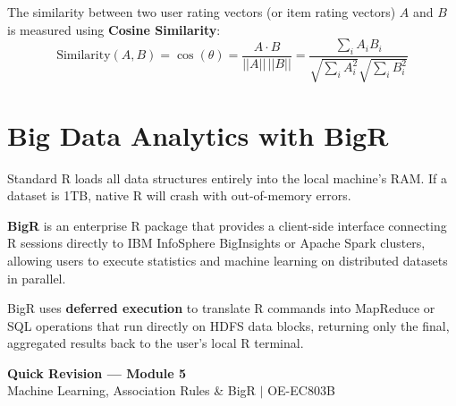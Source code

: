 \documentclass[12pt,a4paper]{article}
\begin{document}
\begin{tcolorbox}[formulabox, title={Cosine Similarity Metric}]
  The similarity between two user rating vectors (or item rating vectors) $A$ and $B$ is measured using \textbf{Cosine Similarity}:
  $$\text{Similarity}(A, B) = \cos(\theta) = \frac{A \cdot B}{||A|| \, ||B||} = \frac{\sum_{i} A_i B_i}{\sqrt{\sum_{i} A_i^2} \sqrt{\sum_{i} B_i^2}}$$
\end{tcolorbox}

\section{Big Data Analytics with BigR}

Standard R loads all data structures entirely into the local machine's RAM. If a dataset is 1TB, native R will crash with out-of-memory errors.

\begin{tcolorbox}[defbox, title={BigR}]
  \textbf{BigR} is an enterprise R package that provides a client-side interface connecting R sessions directly to IBM InfoSphere BigInsights or Apache Spark clusters, allowing users to execute statistics and machine learning on distributed datasets in parallel.
\end{tcolorbox}

BigR uses \textbf{deferred execution} to translate R commands into MapReduce or SQL operations that run directly on HDFS data blocks, returning only the final, aggregated results back to the user's local R terminal.

\newpage

\begin{center}
  {\large\bfseries\color{myred} Quick Revision --- Module 5}\\[3pt]
  {\small\color{mydark} Machine Learning, Association Rules \& BigR $|$ OE-EC803B}
\end{center}
\noindent{\color{myred}\rule{\linewidth}{1.2pt}}
\vspace{8pt}
\end{document}
